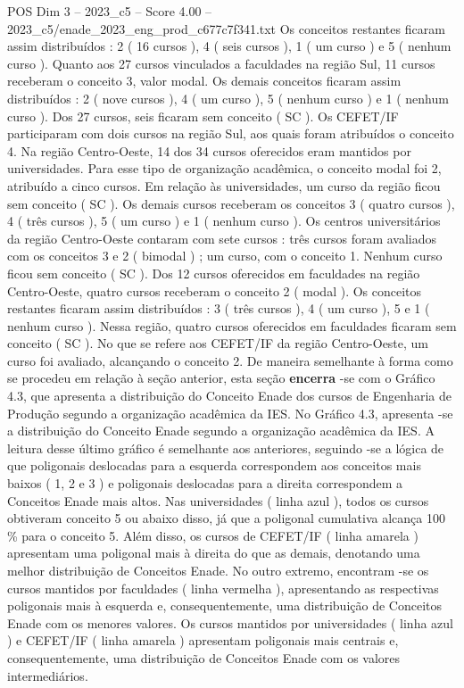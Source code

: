 \begin{textsample}{POS Dim 3 – 2023\_c5 – Score 4.00 – 2023\_c5/enade\_2023\_eng\_prod\_c677c7f341.txt}
Os conceitos restantes ficaram assim distribuídos : 2 ( 16 cursos ), 4 ( seis cursos ), 1 ( um curso ) e 5 ( nenhum curso ).
Quanto aos 27 cursos vinculados a faculdades na região Sul, 11 cursos receberam o conceito 3, valor modal.
Os demais conceitos ficaram assim distribuídos : 2 ( nove cursos ), 4 ( um curso ), 5 ( nenhum curso ) e 1 ( nenhum curso ).
Dos 27 cursos, seis ficaram sem conceito ( SC ).
Os CEFET/IF participaram com dois cursos na região Sul, aos quais foram atribuídos o conceito 4.
Na região Centro-Oeste, 14 dos 34 cursos oferecidos eram mantidos por universidades.
Para esse tipo de organização acadêmica, o conceito modal foi 2, atribuído a cinco cursos.
Em relação às universidades, um curso da região ficou sem conceito ( SC ).
Os demais cursos receberam os conceitos 3 ( quatro cursos ), 4 ( três cursos ), 5 ( um curso ) e 1 ( nenhum curso ).
Os centros universitários da região Centro-Oeste contaram com sete cursos : três cursos foram avaliados com os conceitos 3 e 2 ( bimodal ) ; um curso, com o conceito 1.
Nenhum curso ficou sem conceito ( SC ).
Dos 12 cursos oferecidos em faculdades na região Centro-Oeste, quatro cursos receberam o conceito 2 ( modal ).
Os conceitos restantes ficaram assim distribuídos : 3 ( três cursos ), 4 ( um curso ), 5 e 1 ( nenhum curso ).
Nessa região, quatro cursos oferecidos em faculdades ficaram sem conceito ( SC ).
No que se refere aos CEFET/IF da região Centro-Oeste, um curso foi avaliado, alcançando o conceito 2.
De maneira semelhante à forma como se procedeu em relação à seção anterior, esta seção \textbf{encerra} -se com o Gráfico 4.3, que apresenta a distribuição do Conceito Enade dos cursos de Engenharia de Produção segundo a organização acadêmica da IES.
No Gráfico 4.3, apresenta -se a distribuição do Conceito Enade segundo a organização acadêmica da IES.
A leitura desse último gráfico é semelhante aos anteriores, seguindo -se a lógica de que poligonais deslocadas para a esquerda correspondem aos conceitos mais baixos ( 1, 2 e 3 ) e poligonais deslocadas para a direita correspondem a Conceitos Enade mais altos.
Nas universidades ( linha azul ), todos os cursos obtiveram conceito 5 ou abaixo disso, já que a poligonal cumulativa alcança 100 \% para o conceito 5.
Além disso, os cursos de CEFET/IF ( linha amarela ) apresentam uma poligonal mais à direita do que as demais, denotando uma melhor distribuição de Conceitos Enade.
No outro extremo, encontram -se os cursos mantidos por faculdades ( linha vermelha ), apresentando as respectivas poligonais mais à esquerda e, consequentemente, uma distribuição de Conceitos Enade com os menores valores.
Os cursos mantidos por universidades ( linha azul ) e CEFET/IF ( linha amarela ) apresentam poligonais mais centrais e, consequentemente, uma distribuição de Conceitos Enade com os valores intermediários.

\end{textsample}
